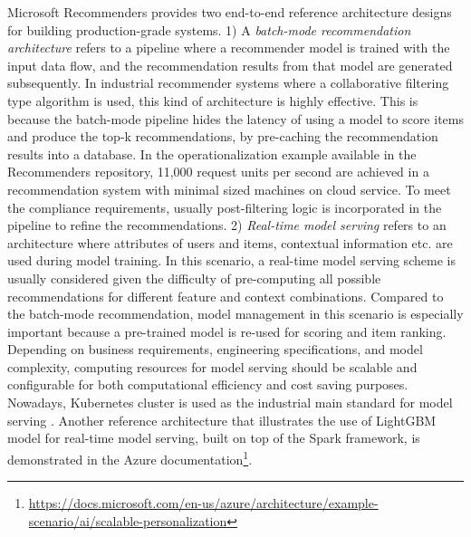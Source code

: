 %
Microsoft Recommenders provides two end-to-end reference architecture designs for building production-grade systems. 
1) A \textit{batch-mode recommendation architecture} refers to a pipeline where a recommender model is trained with the input data flow, and the recommendation results from that model are generated subsequently. 
In industrial recommender systems where a collaborative filtering type algorithm is used, 
this kind of architecture is highly effective. This is because the batch-mode pipeline 
hides the latency of using a model to score items and produce the top-k recommendations, 
by pre-caching the recommendation results into a database. 
In the operationalization example available in the Recommenders repository, 
11,000 request units per second are achieved in a recommendation system with minimal sized machines on cloud service. 
To meet the compliance requirements, usually post-filtering logic is incorporated in the pipeline to refine the recommendations.
2) \textit{Real-time model serving} refers to an architecture where attributes of users and items, contextual information etc. are used during model training. In this scenario, a real-time model serving scheme is usually considered given the difficulty of pre-computing all possible recommendations for different feature and context combinations. Compared to the batch-mode recommendation, model management in this scenario is especially important because a pre-trained model is re-used for scoring and item ranking. Depending on business requirements, engineering specifications, and model complexity, computing resources for model serving should be scalable and configurable for both computational efficiency and cost saving purposes. Nowadays, Kubernetes cluster is used as the industrial main standard for model serving \cite{bernstein2014containers}. Another reference architecture that illustrates the use of LightGBM model \cite{ke2017lightgbm} for real-time model serving, built on top of the Spark framework, is demonstrated in the Azure documentation\footnote{\url{https://docs.microsoft.com/en-us/azure/architecture/example-scenario/ai/scalable-personalization}}.

